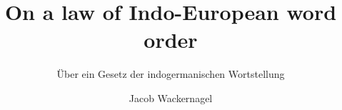 \author{Jacob Wackernagel }
\title{On a law of
Indo-European
word order}
\subtitle{Über ein Gesetz der
indogermanischen Wortstellung
}
\renewcommand{\lsSeries}{classics}
\renewcommand{\lsSeriesNumber}{7}

